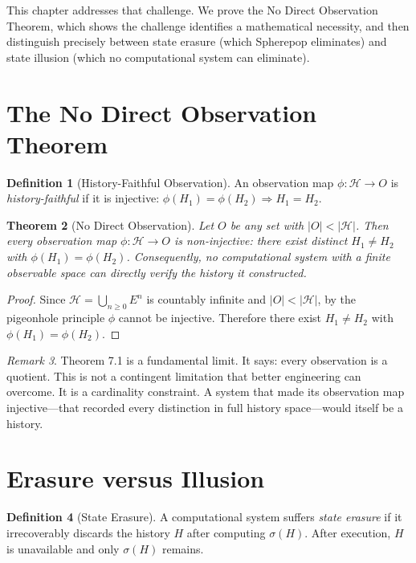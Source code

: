 \documentclass[12pt, a4paper, openany]{book}
\theoremstyle{plain}
\newtheorem{theorem}{Theorem}[chapter]
\theoremstyle{definition}
\newtheorem{definition}[theorem]{Definition}
\theoremstyle{remark}
\newtheorem{remark}[theorem]{Remark}
\newcommand{\calH}{\mathcal{H}}
\begin{document}
This chapter addresses that challenge. We prove the No Direct Observation Theorem,
which shows the challenge identifies a mathematical necessity, and then distinguish
precisely between state erasure (which Spherepop eliminates) and state illusion
(which no computational system can eliminate).

\section{The No Direct Observation Theorem}

\begin{definition}[History-Faithful Observation]
An observation map $\phi : \calH \to O$ is \emph{history-faithful} if it is
injective: $\phi(H_1) = \phi(H_2) \Rightarrow H_1 = H_2$.
\end{definition}

\begin{theorem}[No Direct Observation]
Let $O$ be any set with $|O| < |\calH|$. Then every observation map
$\phi : \calH \to O$ is non-injective: there exist distinct $H_1 \neq H_2$ with
$\phi(H_1) = \phi(H_2)$. Consequently, no computational system with a finite
observable space can directly verify the history it constructed.
\end{theorem}

\begin{proof}
Since $\calH = \bigcup_{n \geq 0} E^n$ is countably infinite and $|O| < |\calH|$,
by the pigeonhole principle $\phi$ cannot be injective. Therefore there exist
$H_1 \neq H_2$ with $\phi(H_1) = \phi(H_2)$.
\end{proof}

\begin{remark}
Theorem 7.1 is a fundamental limit. It says: every observation is a quotient.
This is not a contingent limitation that better engineering can overcome. It is a
cardinality constraint. A system that made its observation map injective---that
recorded every distinction in full history space---would itself be a history.
\end{remark}

\section{Erasure versus Illusion}

\begin{definition}[State Erasure]
A computational system suffers \emph{state erasure} if it irrecoverably discards
the history $H$ after computing $\sigma(H)$. After execution, $H$ is unavailable
and only $\sigma(H)$ remains.
\end{definition}
\end{document}
